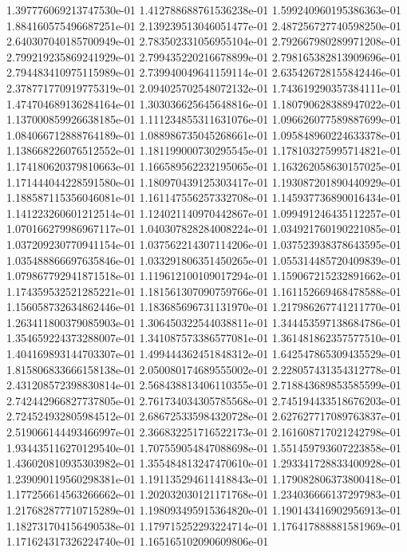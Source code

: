 1.397776069213747530e-01
1.412788688761536238e-01
1.599240960195386363e-01
1.884160575496687251e-01
2.139239513046051477e-01
2.487256727740598250e-01
2.640307040185700949e-01
2.783502331056955104e-01
2.792667980289971208e-01
2.799219235869241929e-01
2.799435220216678899e-01
2.798165382813909696e-01
2.794483410975115989e-01
2.739940049641159114e-01
2.635426728155842446e-01
2.378771770919775319e-01
2.094025702548072132e-01
1.743619290357384111e-01
1.474704689136284164e-01
1.303036625645648816e-01
1.180790628388947022e-01
1.137000859926638185e-01
1.111234855311631076e-01
1.096626077589887699e-01
1.084066712888764189e-01
1.088986735045268661e-01
1.095848960224633378e-01
1.138668226076512552e-01
1.181199000730295545e-01
1.178103275995714821e-01
1.174180620379810663e-01
1.166589562232195065e-01
1.163262058630157025e-01
1.171444044228591580e-01
1.180970439125303417e-01
1.193087201890440929e-01
1.188587115356046081e-01
1.161147556257332708e-01
1.145937736890016434e-01
1.141223260601212514e-01
1.124021140970442867e-01
1.099491246435112257e-01
1.070166279986967117e-01
1.040307828284008224e-01
1.034921760190221085e-01
1.037209230770941154e-01
1.037562214307114206e-01
1.037523938378643595e-01
1.035488866697635846e-01
1.033291806351450265e-01
1.055314485720409839e-01
1.079867792941871518e-01
1.119612100109017294e-01
1.159067215232891662e-01
1.174359532521285221e-01
1.181561307090759766e-01
1.161152669468478588e-01
1.156058732634862446e-01
1.183685696731131970e-01
1.217986267741211770e-01
1.263411800379085903e-01
1.306450322544038811e-01
1.344453597138684786e-01
1.354659224373288007e-01
1.341087573386577081e-01
1.361481862357577510e-01
1.404169893144703307e-01
1.499444362451848312e-01
1.642547865309435529e-01
1.815806833666158138e-01
2.050080174689555002e-01
2.228057431354312778e-01
2.431208572398830814e-01
2.568438813406110355e-01
2.718843689853585599e-01
2.742442966827737805e-01
2.761734034305785568e-01
2.745194433518676203e-01
2.724524932805984512e-01
2.686725335984320728e-01
2.627627717089763837e-01
2.519066144493466997e-01
2.366832251716522173e-01
2.161608717021242798e-01
1.934435116270129540e-01
1.707559054847088698e-01
1.551459793607223858e-01
1.436020810935303982e-01
1.355484813247470610e-01
1.293341728833400928e-01
1.239090119560298381e-01
1.191135294611418843e-01
1.179082806373800418e-01
1.177256614563266662e-01
1.202032030121171768e-01
1.234036666137297983e-01
1.217682877710715289e-01
1.198093495915364820e-01
1.190143416902956913e-01
1.182731704156490538e-01
1.179715252293224714e-01
1.176417888881581969e-01
1.171624317326224740e-01
1.165165102090609806e-01
